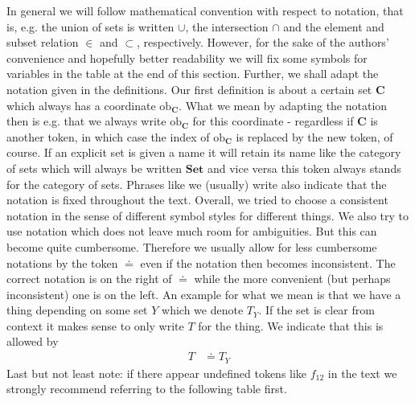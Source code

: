 In general we will follow mathematical convention with respect to notation, that is, e.g. the union of sets is written $\cup$, the intersection $\cap$ and the element and subset relation $\in$ and $\subset$, respectively. However, for the sake of the authors' convenience and hopefully better readability we will fix some symbols for variables in the table at the end of this section. Further, we shall adapt the notation given in the definitions. Our first definition is about a certain set $\mathbf{C}$ which always has a coordinate $\mathrm{ob}_{\mathbf{C}}$. What we mean by adapting the notation then is e.g. that we always write $\mathrm{ob}_{\mathbf{C}}$ for this coordinate - regardless if $\mathbf{C}$ is another token, in which case the index of $\mathrm{ob}_{\mathbf{C}}$ is replaced by the new token, of course. If an explicit set is given a name it will retain its name like the category of sets which will always be written $\mathbf{Set}$ and vice versa this token always stands for the category of sets. Phrases like {\glqq}we (usually) write{\grqq} also indicate that the notation is fixed throughout the text. Overall, we tried to choose a consistent notation in the sense of {\glqq}different symbol styles for different things{\grqq}. We also try to use notation which does not leave much room for ambiguities. But this can become quite cumbersome. Therefore we usually allow for less cumbersome notations by the token $\doteq$ even if the notation then becomes inconsistent. The correct notation is on the right of $\doteq$ while the more convenient (but perhaps inconsistent) one is on the left. An example for what we mean is that we have a thing depending on some set $Y$ which we denote $T_{Y}$. If the set is clear from context it makes sense to only write $T$ for the thing. We indicate that this is allowed by
\begin{align*}
  T
  &\doteq
  T_{Y}
\end{align*}
Last but not least note: if there appear undefined tokens like $f_{12}$ in the text we strongly recommend referring to the following table first.
